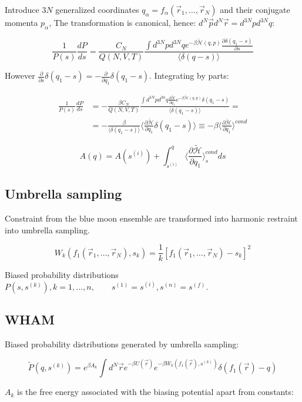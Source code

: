 	Introduce $3N$ generalized coordinates $q_\alpha = f_\alpha(\vec{r}_1, \dots, \vec{r}_N)$ and their conjugate momenta $p_\alpha$,
	The transformation is canonical, hence: $d^N\vec{p}d^N\vec{r} = d^{3N}pd^{3N}q$:

	$$\frac{1}{P(s)}\frac{dP}{ds} = \frac{C_N}{Q(N, V, T)}\frac{\int d^{3N}pd^{3N}qe^{-\beta\tilde{\mathcal{H}}(q, p)}\frac{\partial\delta(q_1-s)}{\partial s}}{\langle\delta(q-s)\rangle}$$

	However $\frac{\partial}{\partial s}\delta(q_1-s) = -\frac{\partial}{\partial q_1}\delta(q_1-s)$.
	Integrating by parts:

	\begin{align*}
		\frac{1}{P(s)}\frac{dP}{ds} &=-\frac{\beta C_N}{Q(N, V, T)}\frac{\int d^{3N}pd^{3n}q\frac{\partial\tilde{\mathcal{H}}}{\partial q_1}e^{-\beta\tilde{\mathcal{H}}(q, p)}\delta(q_1-s)}{\langle\delta(q_1-s)\rangle} = \\
																&= -\frac{\beta}{\langle\delta(q_1-s)\rangle}\biggl\langle\frac{\partial\tilde{\mathcal{H}}}{\partial q_1}\delta(q_1-s)\biggr\rangle \equiv -\beta\biggl\langle\frac{\partial\tilde{\mathcal{H}}}{\partial q_1}\biggr\rangle^{cond}
	\end{align*}

	$$A(q) = A(s^{(i)}) + \int_{s^{(i)}}^q\biggl\langle\frac{\partial\tilde{\mathcal{H}}}{\partial q_1}\biggr\rangle^{cond}_sds$$

	\subsection{Umbrella sampling}
	Constraint from the blue moon ensemble are transformed into harmonic restraint into umbrella sampling.

	$$W_k(f_1(\vec{r}_1, \dots, \vec{r}_N), s_k) = \frac{1}{k}[f_1(\vec{r}_1, \dots, \vec{r}_N)-s_k]^2$$

	Biased probability distributions $P(s, s^{(k)}), k= 1, \dots, n,\qquad s^{(1)}=s^{(i)}, s^{(n)}=s^{(f)}$.

	\subsection{WHAM}
	Biased probability distributions generated by umbrella sampling:

	$$\tilde{P}(q, s^{(k)}) = e^{\beta A_k}\int d^N\vec{r}e^{-\beta U(\vec{r})}e^{-\beta W_k(f_1(\vec{r}), s^{(k)})}\delta(f_1(\vec{r})-q)$$

	$A_k$ is the free energy associated with the biasing potential apart from constants:

